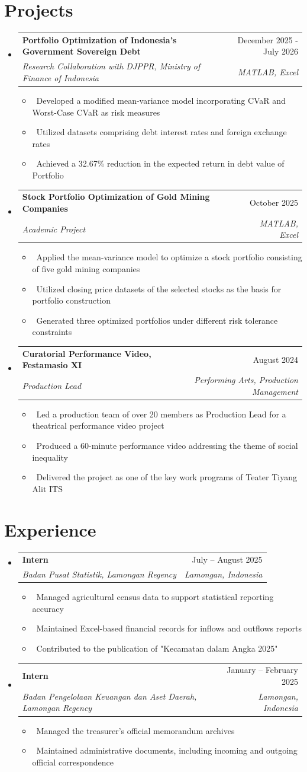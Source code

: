 \documentclass[letterpaper,10pt]{article}
\makeatletter
\newcommand{\resumeItem}[1]{\item\small{#1}}
\newcommand{\resumeSubheading}[4]{
\vspace{-1pt}\item
  \begin{tabular*}{0.97\textwidth}[t]{l@{\extracolsep{\fill}}r}
    \textbf{#1} & #2 \\
    \textit{#3} & \textit{#4} \\
  \end{tabular*}\vspace{-7pt}
}
\newcommand{\resumeSubHeadingList}{\begin{itemize}[leftmargin=0.15in, label={}]}
\newcommand{\resumeSubHeadingListEnd}{\end{itemize}}
\makeatother
\begin{document}
\section{Projects}
\resumeSubHeadingList
  \resumeSubheading
      {Portfolio Optimization of Indonesia's Government Sovereign Debt}{December 2025 - July 2026}
      {Research Collaboration with DJPPR, Ministry of Finance of Indonesia}{MATLAB, Excel}
      \resumeSubHeadingList
          \resumeItem{\textbullet\ Developed a modified mean-variance model incorporating CVaR and Worst-Case CVaR as risk measures}
          \resumeItem{\textbullet\ Utilized datasets comprising debt interest rates and foreign exchange rates}
          \resumeItem{\textbullet\ Achieved a 32.67\% reduction in the expected return in debt value of Portfolio}
      \resumeSubHeadingListEnd
  \resumeSubheading
      {Stock Portfolio Optimization of Gold Mining Companies}{October 2025}
      {Academic Project}{MATLAB, Excel}
      \resumeSubHeadingList
          \resumeItem{\textbullet\ Applied the mean-variance model to optimize a stock portfolio consisting of five gold mining companies}
          \resumeItem{\textbullet\ Utilized closing price datasets of the selected stocks as the basis for portfolio construction}
          \resumeItem{\textbullet\ Generated three optimized portfolios under different risk tolerance constraints}
      \resumeSubHeadingListEnd
  \resumeSubheading
      {Curatorial Performance Video, Festamasio XI}{August 2024}
      {Production Lead}{Performing Arts, Production Management}
      \resumeSubHeadingList
          \resumeItem{\textbullet\ Led a production team of over 20 members as Production Lead for a theatrical performance video project}
          \resumeItem{\textbullet\ Produced a 60-minute performance video addressing the theme of social inequality}
          \resumeItem{\textbullet\ Delivered the project as one of the key work programs of Teater Tiyang Alit ITS}
      \resumeSubHeadingListEnd
\resumeSubHeadingListEnd

\section{Experience}
\resumeSubHeadingList
  \resumeSubheading
      {Intern}{July -- August 2025}
      {Badan Pusat Statistik, Lamongan Regency}{Lamongan, Indonesia}
      \resumeSubHeadingList
          \resumeItem{\textbullet\ Managed agricultural census data to support statistical reporting accuracy}
          \resumeItem{\textbullet\ Maintained Excel-based financial records for inflows and outflows reports}
          \resumeItem{\textbullet\ Contributed to the publication of "Kecamatan dalam Angka 2025"}
      \resumeSubHeadingListEnd
  \resumeSubheading
      {Intern}{January -- February 2025}
      {Badan Pengelolaan Keuangan dan Aset Daerah, Lamongan Regency}{Lamongan, Indonesia}
      \resumeSubHeadingList
          \resumeItem{\textbullet\ Managed the treasurer's official memorandum archives}
          \resumeItem{\textbullet\ Maintained administrative documents, including incoming and outgoing official correspondence}
      \resumeSubHeadingListEnd
\resumeSubHeadingListEnd
\end{document}
